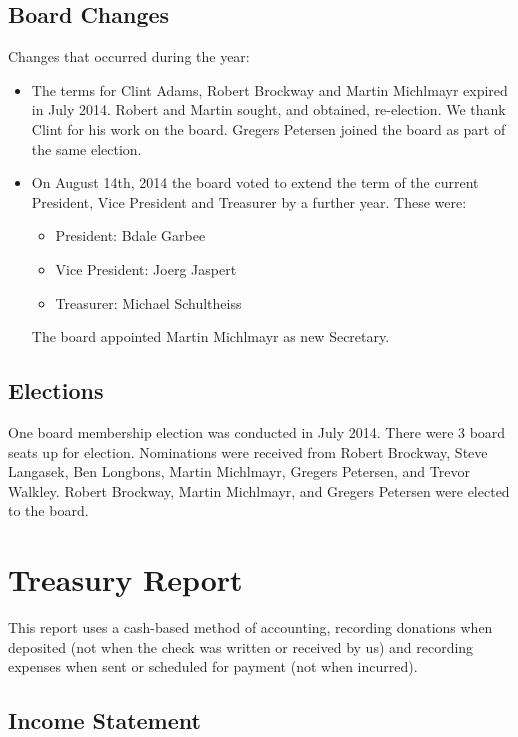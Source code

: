 \documentclass[letterpaper]{report}
\begin{document}
\section{Board Changes}

Changes that occurred during the year:

\begin{itemize}
\item The terms for Clint Adams, Robert Brockway and Martin Michlmayr
expired in July 2014.  Robert and Martin sought, and obtained,
re-election.  We thank Clint for his work on the board.  Gregers
Petersen joined the board as part of the same election.
\item On August 14th, 2014 the board voted to extend the term of the
current President, Vice President and Treasurer by a further year.
These were:
\begin{itemize}
\item President: Bdale Garbee
\item Vice President: Joerg Jaspert
\item Treasurer: Michael Schultheiss
\end{itemize}
The board appointed Martin Michlmayr as new Secretary.
\end{itemize}

\section{Elections}

One board membership election was conducted in July 2014.  There were 3
board seats up for election.  Nominations were received from Robert
Brockway, Steve Langasek, Ben Longbons, Martin Michlmayr, Gregers
Petersen, and Trevor Walkley.  Robert Brockway, Martin Michlmayr, and
Gregers Petersen were elected to the board.

\chapter{Treasury Report}

This report uses a cash-based method of accounting, recording donations when
deposited (not when the check was written or received by us) and recording
expenses when sent or scheduled for payment (not when incurred).

\section{Income Statement}
\end{document}
